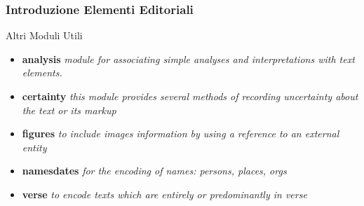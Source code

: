 \documentclass{beamer}
\begin{document}
    \begin{frame}
        \frametitle{Introduzione Elementi Editoriali}
        \addtocounter{nframe}{1}
        
        \begin{block}{Altri Moduli Utili}
           \begin{itemize}
               \item \textbf{analysis} \textit{module for associating simple analyses and interpretations with text elements.}
               \item \textbf{certainty} \textit{this module provides several methods of recording uncertainty about the text or its markup}
               \item \textbf{figures} \textit{to include images information by using a reference to an external entity}
               \item \textbf{namesdates} \textit{for the encoding of names: persons, places, orgs}
               \item \textbf{verse} \textit{to encode texts which are entirely or predominantly in verse}
           \end{itemize}
        \end{block}
        
    \end{frame}
    
        
    
            
        
\end{document}
